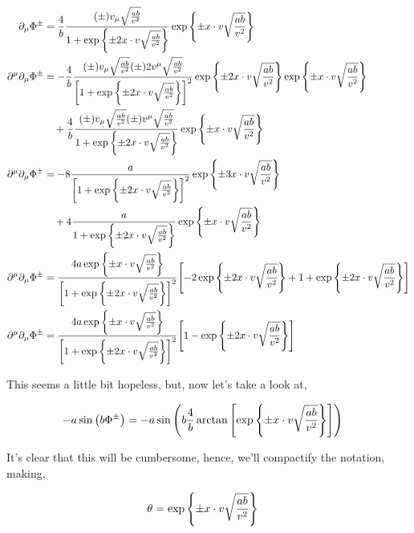 \begin{align}
    \partial_\mu\Phi^{\pm}&=\frac4b\frac{\qty(\pm)v_\mu\sqrt{\frac{ab}{v^2}}}
        {1+\exp\qty{\pm2x\cdot v\sqrt{\frac{ab}{v^2}}}}
    \exp\qty{\pm x\cdot v\sqrt{\frac{ab}{v^2}}}\nonumber\\
    \partial^\mu\partial_\mu\Phi^{\pm}&=-\frac4b
    \frac{\qty(\pm)v_\mu\sqrt{\frac{ab}{v^2}}\qty(\pm) 2v^\mu\sqrt{\frac{ab}{v^2}}}
        {\qty[1+\exp\qty{\pm2x\cdot v\sqrt{\frac{ab}{v^2}}}]^2}
    \exp\qty{\pm 2x\cdot v\sqrt{\frac{ab}{v^2}}}
    \exp\qty{\pm x\cdot v\sqrt{\frac{ab}{v^2}}}\nonumber\\
    &\quad+\frac4b\frac{\qty(\pm)v_\mu\sqrt{\frac{ab}{v^2}}\qty(\pm) v^\mu\sqrt{\frac{ab}{v^2}}}
        {1+\exp\qty{\pm2x\cdot v\sqrt{\frac{ab}{v^2}}}}
    \exp\qty{\pm x\cdot v\sqrt{\frac{ab}{v^2}}}\nonumber\\
    \partial^\mu\partial_\mu\Phi^{\pm}&=-8
    \frac{a}{\qty[1+\exp\qty{\pm2x\cdot v\sqrt{\frac{ab}{v^2}}}]^2}
    \exp\qty{\pm 3x\cdot v\sqrt{\frac{ab}{v^2}}}\nonumber\\
    &\quad+4\frac{a}{1+\exp\qty{\pm2x\cdot v\sqrt{\frac{ab}{v^2}}}}
    \exp\qty{\pm x\cdot v\sqrt{\frac{ab}{v^2}}}\nonumber\\
    \partial^\mu\partial_\mu\Phi^{\pm}&=
    \frac{4a\exp\qty{\pm x\cdot v\sqrt{\frac{ab}{v^2}}}}
        {\qty[1+\exp\qty{\pm2x\cdot v\sqrt{\frac{ab}{v^2}}}]^2}
    \qty[-2\exp\qty{\pm 2x\cdot v\sqrt{\frac{ab}{v^2}}}+1+\exp\qty{\pm2x\cdot v\sqrt{\frac{ab}{v^2}}}]\nonumber\\
    \partial^\mu\partial_\mu\Phi^{\pm}&=
    \frac{4a\exp\qty{\pm x\cdot v\sqrt{\frac{ab}{v^2}}}}
        {\qty[1+\exp\qty{\pm2x\cdot v\sqrt{\frac{ab}{v^2}}}]^2}
    \qty[1-\exp\qty{\pm2x\cdot v\sqrt{\frac{ab}{v^2}}}]\label{dalambertian}
\end{align}

This seems a little bit hopeless, but, now let's take a look at,

\begin{align}
    -a\sin\qty(b\Phi^\pm)&=-a\sin\qty(b\frac4b\arctan\qty[\exp\qty{\pm x\cdot v\sqrt{\frac{ab}{v^2}}}])\nonumber
\end{align}

It's clear that this will be cumbersome, hence, we'll compactify the notation, making,

\begin{align}
    \theta&=\exp\qty{\pm x\cdot v\sqrt{\frac{ab}{v^2}}}\nonumber
\end{align}

